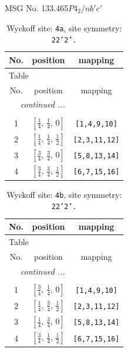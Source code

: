 \documentclass[fleqn,8pt]{jsarticle}
\begin{document}
\setcounter{MaxMatrixCols}{32}

\renewcommand{\tablename}{Table~}
\renewcommand{\figurename}{Figure~}
\begin{center}
\LARGE
MSG No. 133.465\quad$P4_{2}/nb'c'$
\end{center}
\renewcommand{\arraystretch}{1.2}
\begin{longtable}{ccc}
\caption{Wyckoff site: {\tt 4a}, site symmetry: {\tt 22'2'.}}
 \\
 \hline \hline
No. & position & mapping \\ \hline \endfirsthead

\multicolumn{2}{l}{\tablename\ \thetable{}} \\
 \hline \hline
No. & position & mapping \\ \hline \endhead

 \hline \hline
\multicolumn{2}{r}{\footnotesize\it continued ...} \\ \endfoot

 \hline \hline
\multicolumn{2}{r}{} \\ \endlastfoot

1 & $\left[ \frac{1}{4},\, \frac{1}{4},\, 0 \right]$ & {\tt [1,4,9,10]} \\ \hline
2 & $\left[ \frac{1}{4},\, \frac{1}{4},\, \frac{1}{2} \right]$ & {\tt [2,3,11,12]} \\ \hline
3 & $\left[ \frac{3}{4},\, \frac{3}{4},\, 0 \right]$ & {\tt [5,8,13,14]} \\ \hline
4 & $\left[ \frac{3}{4},\, \frac{3}{4},\, \frac{1}{2} \right]$ & {\tt [6,7,15,16]} \\
\end{longtable}
\renewcommand{\arraystretch}{1.2}
\begin{longtable}{ccc}
\caption{Wyckoff site: {\tt 4b}, site symmetry: {\tt 22'2'.}}
 \\
 \hline \hline
No. & position & mapping \\ \hline \endfirsthead

\multicolumn{2}{l}{\tablename\ \thetable{}} \\
 \hline \hline
No. & position & mapping \\ \hline \endhead

 \hline \hline
\multicolumn{2}{r}{\footnotesize\it continued ...} \\ \endfoot

 \hline \hline
\multicolumn{2}{r}{} \\ \endlastfoot

1 & $\left[ \frac{3}{4},\, \frac{1}{4},\, 0 \right]$ & {\tt [1,4,9,10]} \\ \hline
2 & $\left[ \frac{1}{4},\, \frac{3}{4},\, \frac{1}{2} \right]$ & {\tt [2,3,11,12]} \\ \hline
3 & $\left[ \frac{1}{4},\, \frac{3}{4},\, 0 \right]$ & {\tt [5,8,13,14]} \\ \hline
4 & $\left[ \frac{3}{4},\, \frac{1}{4},\, \frac{1}{2} \right]$ & {\tt [6,7,15,16]} \\
\end{longtable}
\end{document}
